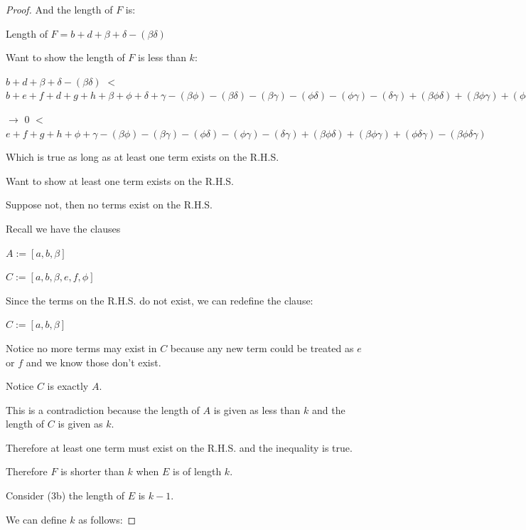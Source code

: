 \documentclass[manuscript]{acmart}
\begin{document}
\begin{proof}
        And the length of $F$ is:

        Length of $F = b + d + \beta + \delta - (\beta \delta)$

        Want to show the length of $F$ is less than $k$:

        $b + d + \beta + \delta - (\beta \delta)$
        $<$
        $b + e + f + d + g + h 
            + \beta + \phi + \delta + \gamma
            - (\beta \phi) - (\beta \delta) - (\beta \gamma) - (\phi \delta) - (\phi \gamma) - (\delta \gamma)
            + (\beta \phi \delta) + (\beta \phi \gamma) + (\phi \delta \gamma)
            - (\beta \phi \delta \gamma)
        $

        $\rightarrow$
        $0$
        $<$
        $e + f + g + h 
            + \phi + \gamma
            - (\beta \phi) - (\beta \gamma) - (\phi \delta) - (\phi \gamma) - (\delta \gamma)
            + (\beta \phi \delta) + (\beta \phi \gamma) + (\phi \delta \gamma)
            - (\beta \phi \delta \gamma)
        $

        Which is true as long as at least one term exists on the R.H.S.

        Want to show at least one term exists on the R.H.S.

        Suppose not, then no terms exist on the R.H.S.

        Recall we have the clauses

        $A := [a, b, \beta]$

        $C := [a, b, \beta, e, f, \phi]$

        Since the terms on the R.H.S. do not exist, we can redefine the clause:

        $C := [a, b, \beta]$

        Notice no more terms may exist in $C$ because any new term could be treated as $e$ or $f$ and we know those don't exist.

        Notice $C$ is exactly $A$.

        This is a contradiction because the length of $A$ is given as less than $k$ and the length of $C$ is given as $k$.

        Therefore at least one term must exist on the R.H.S. and the inequality is true.

        Therefore $F$ is shorter than $k$ when $E$ is of length $k$.

        Consider (3b) the length of $E$ is $k - 1$.

        We can define $k$ as follows:


\end{proof}
\end{document}
